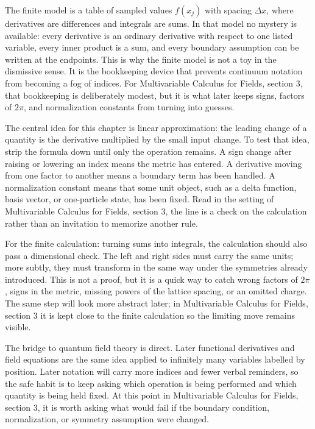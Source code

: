 The finite model is a table of sampled values \(f(x_j)\) with spacing \(\Delta x\), where derivatives are differences and integrals are sums.  In that model no mystery is available: every derivative is an ordinary derivative with respect to one listed variable, every inner product is a sum, and every boundary assumption can be written at the endpoints.  This is why the finite model is not a toy in the dismissive sense.  It is the bookkeeping device that prevents continuum notation from becoming a fog of indices.  For Multivariable Calculus for Fields, section 3, that bookkeeping is deliberately modest, but it is what later keeps signs, factors of \(2\pi\), and normalization constants from turning into guesses.

The central idea for this chapter is linear approximation: the leading change of a quantity is the derivative multiplied by the small input change.  To test that idea, strip the formula down until only the operation remains.  A sign change after raising or lowering an index means the metric has entered.  A derivative moving from one factor to another means a boundary term has been handled.  A normalization constant means that some unit object, such as a delta function, basis vector, or one-particle state, has been fixed.  Read in the setting of Multivariable Calculus for Fields, section 3, the line is a check on the calculation rather than an invitation to memorize another rule.

For the finite calculation: turning sums into integrals, the calculation should also pass a dimensional check.  The left and right sides must carry the same units; more subtly, they must transform in the same way under the symmetries already introduced.  This is not a proof, but it is a quick way to catch wrong factors of \(2\pi\), signs in the metric, missing powers of the lattice spacing, or an omitted charge.  The same step will look more abstract later; in Multivariable Calculus for Fields, section 3 it is kept close to the finite calculation so the limiting move remains visible.

The bridge to quantum field theory is direct.  Later functional derivatives and field equations are the same idea applied to infinitely many variables labelled by position.  Later notation will carry more indices and fewer verbal reminders, so the safe habit is to keep asking which operation is being performed and which quantity is being held fixed.  At this point in Multivariable Calculus for Fields, section 3, it is worth asking what would fail if the boundary condition, normalization, or symmetry assumption were changed.

